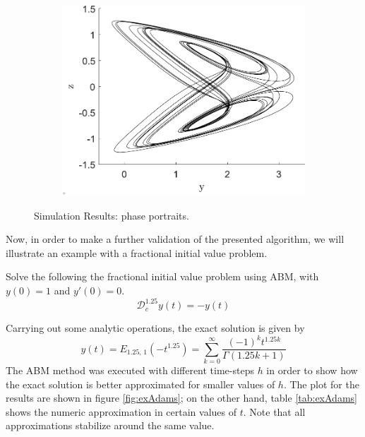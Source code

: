 \begin{figure}[H]
\begin{subfigure}[ht]{0.3\textwidth}
\includegraphics[scale=0.28]{files/int_adams_yz.pdf}
\end{subfigure}
\caption{Simulation Results: phase portraits.}
\label{fig:financeValidation}
\end{figure}
Now, in order to make a further validation of the presented algorithm, we will illustrate an example with a fractional initial value problem.
\begin{exmp}\label{ex:adam}
Solve the following the fractional initial value problem using ABM, with $y(0) = 1$ and $y'(0) = 0$.
\begin{equation}
    \mathcal{D}_c^{1.25}y(t)=-y(t)
\end{equation}
\end{exmp}
Carrying out some analytic operations, the exact solution is given by
\begin{equation}
    y(t) = E_{1.25,\,1}(-t^{1.25})=\sum_{k=0}^{\infty}\dfrac{(-1)^kt^{1.25k}}{\Gamma(1.25k +1)} 
\end{equation}
The ABM method was executed with different time-steps $h$ in order to show how the exact solution is better approximated for smaller values of $h$. The plot for the results are shown in figure \ref{fig:exAdams}; on the other hand, table \ref{tab:exAdams} shows the numeric approximation in certain values of $t$. Note that all approximations stabilize around the same value.
